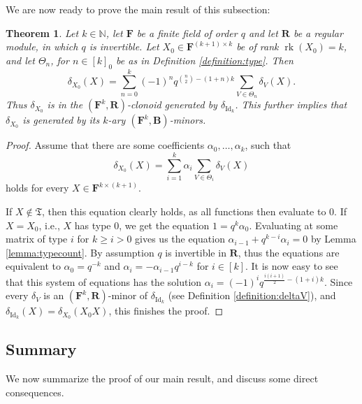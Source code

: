 \documentclass[11pt]{amsart}
\theoremstyle{plain}
\newtheorem{theorem}[thm]{Theorem}
\theoremstyle{definition}
\newcommand{\N}{{\mathbb N}}
\newcommand{\F}{{\mathbf F}}
\newcommand{\alg}[1]{\mathbf{#1}}
\newcommand{\algB}{\alg{B}}
\newcommand{\algR}{\alg{R}}
\DeclareMathOperator{\rk}{rk}
\DeclareMathOperator{\Id}{Id}
\begin{document}
We are now ready to prove the main result of this subsection:

\begin{theorem} \label{thm:reprdelta}
Let $k\in \N$, let $\F$ be a finite field of order $q$ and let $\algR$ be a regular module, in which $q$ is invertible. Let $X_0 \in \F^{(k+1)\times k}$ be of rank $\rk(X_0) = k$, and let $\Theta_n$, for $n\in [k]_0$ be as in Definition \ref{definition:type}. Then
$$\delta_{X_0}(X) = \sum_{n=0}^k (-1)^n q^{ \binom{n}{2} - (1 + n)k} \sum_{V \in \Theta_n} \delta_V(X).$$
Thus $\delta_{X_0}$ is in the $(\F^k,\algR)$-clonoid generated by $\delta_{\Id_k}$. This further implies that $\delta_{X_0}$ is generated by its $k$-ary $(\F^k,\algB)$-minors.
\end{theorem}

\begin{proof}
Assume that there are some coefficients $\alpha_0,\ldots, \alpha_k$, such that \[\delta_{X_0}(X) = \sum_{i=1}^k \alpha_i \sum_{V \in \Theta_i} \delta_V(X)\] holds for every $X \in \F^{k\times (k+1)}$.

If $X \notin \mathfrak T$, then this equation clearly holds, as all functions then evaluate to $0$. If $X = X_0$, i.e., $X$ has type $0$, we get the equation $1= q^{k} \alpha_0$. Evaluating at some matrix of type $i$ for $k\geq i>0$ gives us the equation $\alpha_{i-1} + q^{k-i} \alpha_i = 0$ by Lemma \ref{lemma:typecount}. By assumption $q$ is invertible in $\algR$, thus the equations are equivalent to $\alpha_0 = q^{-k}$ and $\alpha_i = -\alpha_{i-1}q^{i-k}$ for $i\in[k]$. It is now easy to see that this system of equations has the solution $\alpha_i = (-1)^i q^{\frac{i(i+1)}2 - (1+i)k}$. Since every $\delta_V$ is an $(\alg F^k, \alg R)$-minor of $\delta_{\Id_k}$ (see Definition \ref{definition:deltaV}), and $\delta_{\Id_k}(X) = \delta_{X_0}(X_0X)$, this finishes the proof.

\end{proof}


\subsection{Summary} \label{sect:proofsummary}

We now summarize the proof of our main result, and discuss some direct consequences.
\end{document}
